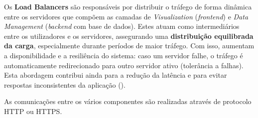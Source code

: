Os \textbf{Load Balancers} são responsáveis por distribuir o tráfego de forma dinâmica entre os servidores que compõem as camadas de \textit{Visualization} (\textit{frontend}) e \textit{Data Management} (\textit{backend} com base de dados). Estes atuam como intermediários entre os utilizadores e os servidores, assegurando uma \textbf{distribuição equilibrada da carga}, especialmente durante períodos de maior tráfego. Com isso, aumentam a disponibilidade e a resiliência do sistema: caso um servidor falhe, o tráfego é automaticamente redirecionado para outro servidor ativo (tolerância a falhas). Esta abordagem contribui ainda para a redução da latência e para evitar respostas inconsistentes da aplicação (\Cite{F52025}).

As comunicações entre os vários componentes são realizadas através de protocolo HTTP ou HTTPS.